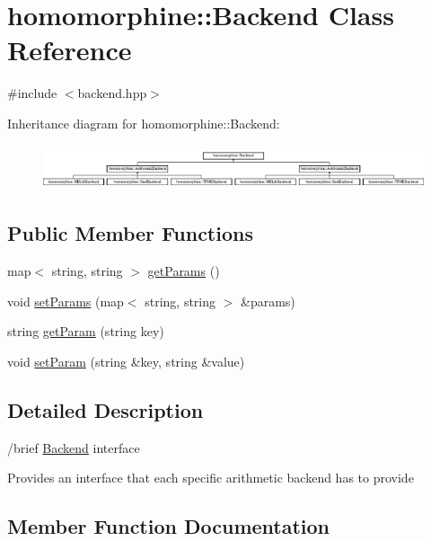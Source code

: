\hypertarget{classhomomorphine_1_1_backend}{}\section{homomorphine\+::Backend Class Reference}
\label{classhomomorphine_1_1_backend}


{\ttfamily \#include $<$backend.\+hpp$>$}

Inheritance diagram for homomorphine\+::Backend\+:\begin{figure}[H]
\begin{center}
\leavevmode
\includegraphics[height=1.314554cm]{classhomomorphine_1_1_backend}
\end{center}
\end{figure}
\subsection*{Public Member Functions}
\begin{DoxyCompactItemize}
\item 
map$<$ string, string $>$ \mbox{\hyperlink{classhomomorphine_1_1_backend_a107e05b3bd55271356a57fbc0c1df091}{get\+Params}} ()
\item 
void \mbox{\hyperlink{classhomomorphine_1_1_backend_aed04b9aa4eb2c08801e099b16b4da4b0}{set\+Params}} (map$<$ string, string $>$ \&params)
\item 
string \mbox{\hyperlink{classhomomorphine_1_1_backend_a34191d0dbdd9e300a88242156f90eb9b}{get\+Param}} (string key)
\item 
void \mbox{\hyperlink{classhomomorphine_1_1_backend_aacb924f4de6d50347d550da85aec15a2}{set\+Param}} (string \&key, string \&value)
\end{DoxyCompactItemize}


\subsection{Detailed Description}
/brief \mbox{\hyperlink{classhomomorphine_1_1_backend}{Backend}} interface

Provides an interface that each specific arithmetic backend has to provide 

\subsection{Member Function Documentation}
\mbox{\label{classhomomorphine_1_1_backend_a34191d0dbdd9e300a88242156f90eb9b}} 
